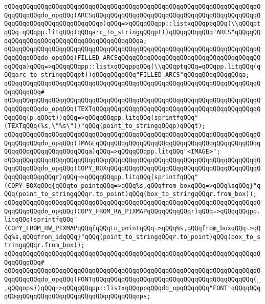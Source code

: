 \verb|qQQqqQQqqQQqqQQqqQQqqQQqqQQqqQQqqQQqqQQqqQQqqQQqqQQqqQQqqQQqqQQqqQQqqQQqqQQqqQQqdo_opqQQq(ARCSqQQqqQQqqQQqqQQqqQQqqQQqqQQqqQQqqQQqqQQqqQQqqQQqqQQqqQQqqQQqqQQqqQQqqQQqa)qQQq=>qQQqqQQqpp::listxqQQqppqQQq(\\qQQqptqQQq=qQQqpp.litqQQq(qQQqarc_to_stringqQQqpt))qQQqqQQqqQQq"ARCS"qQQqqQQqqQQqqQQqqQQqqQQqqQQqqQQqqQQqqQQqqQQqa;|\newline
\verb|qQQqqQQqqQQqqQQqqQQqqQQqqQQqqQQqqQQqqQQqqQQqqQQqqQQqqQQqqQQqqQQqqQQqqQQqqQQqqQQqdo_opqQQq(FILLED_ARCSqQQqqQQqqQQqqQQqqQQqqQQqqQQqqQQqqQQqqQQqqQQqa)qQQq=>qQQqqQQqpp::listxqQQqppqQQq(\\qQQqptqQQq=qQQqpp.litqQQq(qQQqarc_to_stringqQQqpt))qQQqqQQqqQQq"FILLED_ARCS"qQQqqQQqqQQqqQQqa;|\newline
\verb|qQQqqQQqqQQqqQQqqQQqqQQqqQQqqQQqqQQqqQQqqQQqqQQqqQQqqQQqqQQqqQQqqQQqqQQqqQQqqQQq#|\newline
\verb|qQQqqQQqqQQqqQQqqQQqqQQqqQQqqQQqqQQqqQQqqQQqqQQqqQQqqQQqqQQqqQQqqQQqqQQqqQQqqQQqdo_opqQQq(TEXTqQQqqQQqqQQqqQQqqQQqqQQqqQQqqQQqqQQqqQQqqQQqqQQqqQQq(p,qQQqt))qQQq=>qQQqqQQqpp.litqQQq(sprintfqQQq"(TEXTqQQq(%s,\"%s\"))"qQQq(point_to_stringqQQqp)qQQqt);|\newline
\verb|qQQqqQQqqQQqqQQqqQQqqQQqqQQqqQQqqQQqqQQqqQQqqQQqqQQqqQQqqQQqqQQqqQQqqQQqqQQqqQQqdo_opqQQq(IMAGEqQQqqQQqqQQqqQQqqQQqqQQqqQQqqQQqqQQqqQQqqQQqqQQqqQQqqQQqqQQqqQQqqQQqa)qQQq=>qQQqqQQqpp.litqQQq"<IMAGE>";|\newline
\verb|qQQqqQQqqQQqqQQqqQQqqQQqqQQqqQQqqQQqqQQqqQQqqQQqqQQqqQQqqQQqqQQqqQQqqQQqqQQqqQQqdo_opqQQq(COPY_BOXqQQqqQQqqQQqqQQqqQQqqQQqqQQqqQQqqQQqqQQqqQQqqQQqqQQqqQQqr)qQQq=>qQQqqQQqpp.litqQQq(sprintfqQQq"(COPY_BOXqQQq{qQQqto_pointqQQq=>qQQq%s,qQQqfrom_boxqQQq=>qQQq%sqQQq}"qQQq(point_to_stringqQQqr.to_point)qQQq(box_to_stringqQQqr.from_box));|\newline
\verb|qQQqqQQqqQQqqQQqqQQqqQQqqQQqqQQqqQQqqQQqqQQqqQQqqQQqqQQqqQQqqQQqqQQqqQQqqQQqqQQqdo_opqQQq(COPY_FROM_RW_PIXMAPqQQqqQQqqQQqr)qQQq=>qQQqqQQqpp.litqQQq(sprintfqQQq"(COPY_FROM_RW_PIXMAPqQQq{qQQqto_pointqQQq=>qQQq%s,qQQqfrom_boxqQQq=>qQQq%s,qQQqfrom_idqQQq}"qQQq(point_to_stringqQQqr.to_point)qQQq(box_to_stringqQQqr.from_box));|\newline
\verb|qQQqqQQqqQQqqQQqqQQqqQQqqQQqqQQqqQQqqQQqqQQqqQQqqQQqqQQqqQQqqQQqqQQqqQQqqQQqqQQq#|\newline
\verb|qQQqqQQqqQQqqQQqqQQqqQQqqQQqqQQqqQQqqQQqqQQqqQQqqQQqqQQqqQQqqQQqqQQqqQQqqQQqqQQqdo_opqQQq(FONTqQQqqQQqqQQqqQQqqQQqqQQqqQQqqQQqqQQqqQQqqQQq(_,qQQqops))qQQq=>qQQqqQQqpp::listxqQQqppqQQqdo_opqQQqqQQq"FONT"qQQqqQQqqQQqqQQqqQQqqQQqqQQqqQQqqQQqqQQqqQQqops;|\newline
